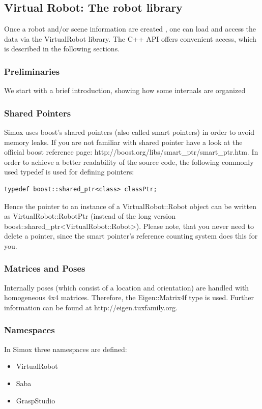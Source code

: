 \subsection{Virtual Robot: The robot library}
Once a robot and/or scene information are created , one can load and access the data via the VirtualRobot library. The C++ API offers convenient access, which is described in the following sections. 
\par
\subsubsection{Preliminaries}
We start with a brief introduction, showing how some internals are organized 
\par
\subsubsection*{Shared Pointers}
Simox uses boost's shared pointers (also called smart pointers) in order to avoid memory leaks. If you are not familiar with shared pointer have a look at the official boost reference page: http://boost.org/libs/smart\_ptr/smart\_ptr.htm. In order to achieve a better readability of the source code, the following commonly used typedef is used for defining pointers: 
\begin{lstlisting}
typedef boost::shared_ptr<class> classPtr;
\end{lstlisting}
Hence the pointer to an instance of a VirtualRobot::Robot object can be written as VirtualRobot::RobotPtr (instead of the long version boost::shared\_ptr<VirtualRobot::Robot>). Please note, that you never need to delete a pointer, since the smart pointer's reference counting system does this for you. 
\subsubsection*{Matrices and Poses}
Internally poses (which consist of a location and orientation) are handled with homogeneous 4x4 matrices. Therefore, the Eigen::Matrix4f type is used. Further information can be found at http://eigen.tuxfamily.org. 
\par
\subsubsection*{Namespaces}
In Simox three namespaces are defined: 
\begin{itemize}
\item VirtualRobot
\item Saba
\item GraspStudio
\end{itemize}
